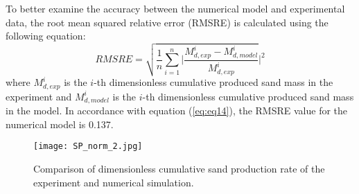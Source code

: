 \documentclass{article}
\begin{document}
To better examine the accuracy between the numerical model and experimental data, the root mean squared relative error (RMSRE) is calculated using the following equation:
\begin{equation}
    RMSRE =\sqrt{ \frac{1}{n} \sum_{i=1}^{n} \Bigg| \frac{M^i_{d, exp} - M^i_{d,model}}{M^i_{d, exp}}}\Bigg|^{2} 
    \label{eq:eq14}
\end{equation}
where $M_{d,{exp}}^i$ is the $i$-th dimensionless cumulative produced sand mass in the experiment and $M_{d,{model}}^i$ is the $i$-th dimensionless cumulative produced sand mass in the model. In accordance with equation (\ref{eq:eq14}), the RMSRE value for the numerical model is 0.137.  

\begin{figure}[H]
\begin{centering}
\texttt{[image: SP\_norm\_2.jpg]}
\par\end{centering}
\caption{Comparison of dimensionless cumulative sand production rate of the experiment and numerical simulation.\label{fig:fig1}}
\end{figure}
\end{document}
